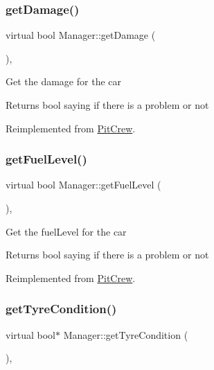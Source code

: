 \subsubsection{\texorpdfstring{get\+Damage()}{getDamage()}}
{\footnotesize\ttfamily virtual bool Manager\+::get\+Damage (\begin{DoxyParamCaption}{ }\end{DoxyParamCaption})\hspace{0.3cm}{\ttfamily [inline]}, {\ttfamily [virtual]}}

Get the damage for the car \begin{DoxyReturn}{Returns}
bool saying if there is a problem or not 
\end{DoxyReturn}


Reimplemented from \mbox{\hyperlink{class_pit_crew_a0cd6a3161f5b016241b3a6a51d526c4f}{Pit\+Crew}}.

\mbox{\label{class_manager_a832a35309c0a23038f2fc94879e2dab8}} 
\subsubsection{\texorpdfstring{get\+Fuel\+Level()}{getFuelLevel()}}
{\footnotesize\ttfamily virtual bool Manager\+::get\+Fuel\+Level (\begin{DoxyParamCaption}{ }\end{DoxyParamCaption})\hspace{0.3cm}{\ttfamily [inline]}, {\ttfamily [virtual]}}

Get the fuel\+Level for the car \begin{DoxyReturn}{Returns}
bool saying if there is a problem or not 
\end{DoxyReturn}


Reimplemented from \mbox{\hyperlink{class_pit_crew_a6960d91ce635df7f846301e21ae64450}{Pit\+Crew}}.

\mbox{\label{class_manager_ae4984934c5751a4cfd5932370191b67d}} 
\subsubsection{\texorpdfstring{get\+Tyre\+Condition()}{getTyreCondition()}}
{\footnotesize\ttfamily virtual bool$\ast$ Manager\+::get\+Tyre\+Condition (\begin{DoxyParamCaption}{ }\end{DoxyParamCaption})\hspace{0.3cm}{\ttfamily [inline]}, {\ttfamily [virtual]}}


